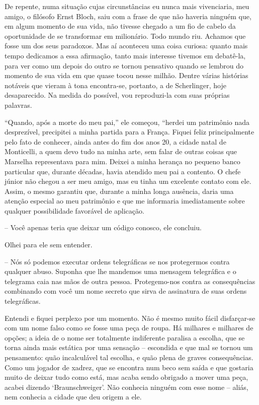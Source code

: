 De repente, numa situação cujas circunstâncias eu nunca mais
vivenciaria, meu amigo, o filósofo Ernst Bloch, saiu com a frase de que
não haveria ninguém que, em algum momento de sua vida, não tivesse
chegado a um fio de cabelo da oportunidade de se transformar em
milionário. Todo mundo riu. Achamos que fosse um dos seus paradoxos. Mas
aí aconteceu uma coisa curiosa: quanto mais tempo dedicamos a essa
afirmação, tanto mais interesse tivemos em debatê-la, para ver como um
depois do outro se tornou pensativo quando se lembrou do momento de sua
vida em que quase tocou nesse milhão. Dentre várias histórias notáveis
que vieram à tona encontra-se, portanto, a de Scherlinger, hoje
desaparecido. Na medida do possível, vou reproduzi-la com suas próprias
palavras.

``Quando, após a morte do meu pai,'' ele começou, ``herdei um patrimônio
nada desprezível, precipitei a minha partida para a França. Fiquei feliz
principalmente pelo fato de conhecer, ainda antes do fim dos anos 20, a
cidade natal de Monticelli, a quem devo tudo na minha arte, sem falar de
outras coisas que Marselha representava para mim. Deixei a minha herança
no pequeno banco particular que, durante décadas, havia atendido meu pai
a contento. O chefe júnior não chegou a ser meu amigo, mas eu tinha um
excelente contato com ele. Assim, o mesmo garantiu que, durante a minha
longa ausência, daria uma atenção especial ao meu patrimônio e que me
informaria imediatamente sobre qualquer possibilidade favorável de
aplicação.

-- Você apenas teria que deixar um código conosco, ele concluiu.

Olhei para ele sem entender.

-- Nós só podemos executar ordens telegráficas se nos protegermos contra
qualquer abuso. Suponha que lhe mandemos uma mensagem telegráfica e o
telegrama caia nas mãos de outra pessoa. Protegemo-nos contra as
consequências combinando com você um nome secreto que sirva de
assinatura de suas ordens telegráficas.

Entendi e fiquei perplexo por um momento. Não é mesmo muito fácil
disfarçar-se com um nome falso como se fosse uma peça de roupa. Há
milhares e milhares de opções; a ideia de o nome ser totalmente
indiferente paralisa a escolha, que se torna ainda mais estática por uma
sensação -- escondida e que mal se tornou um pensamento: quão
incalculável tal escolha, e quão plena de graves consequências. Como um
jogador de xadrez, que se encontra num beco sem saída e que gostaria
muito de deixar tudo como está, mas acaba sendo obrigado a mover uma
peça, acabei dizendo `Braunschweiger'. Não conhecia ninguém com esse
nome -- aliás, nem conhecia a cidade que deu origem a ele.

